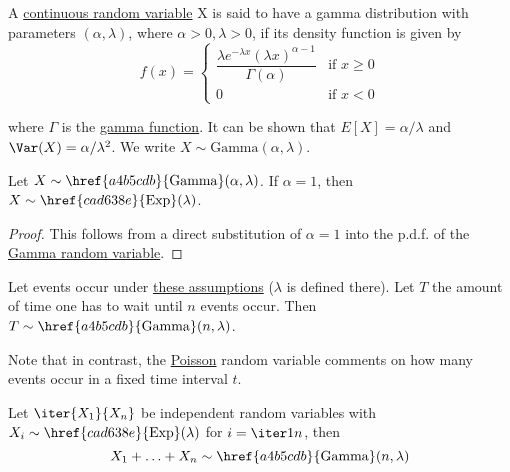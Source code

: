 \label{a4b5cdb}

A \href{bdb1e15}{continuous random variable} X is said to have a gamma
distribution with parameters $(\alpha,\lambda)$, where $\alpha>0,\lambda>0$, if
its density function is given by
$$
  f(x)=\begin{cases}
    \dfrac{\lambda e^{-\lambda x}(\lambda x)^{\alpha-1}}{\Gamma(\alpha)} & \text{if }x\geq0 \\
    0                                                                    & \text{if }x<0
  \end{cases}
$$

where $\Gamma$ is the \href{ce1fa3f}{gamma function}. It can be shown that
$E[X]=\alpha/\lambda$ and $\Var(X)=\alpha/\lambda^2$. We write
$X\sim\mathrm{Gamma}(\alpha,\lambda)$.

\label{af98a66}

Let $X\sim\href{a4b5cdb}{\mathrm{Gamma}}(\alpha,\lambda)$. If $\alpha=1$, then
$X\sim\href{cad638e}{\mathrm{Exp}}(\lambda)$.

\begin{proof}
  This follows from a direct substitution of $\alpha=1$ into the p.d.f. of the
  \href{a4b5cdb}{Gamma random variable}.
\end{proof}

\label{de11b28}

Let events occur under \href{d544278}{these assumptions} ($\lambda$ is defined
there). Let $T$ the amount of time one has to wait until $n$ events occur. Then
$T\sim\href{a4b5cdb}{\mathrm{Gamma}}(n,\lambda)$.

Note that in contrast, the \href{fc4dd45}{Poisson} random variable comments on
how many events occur in a fixed time interval $t$.

\label{ba003c7}

Let $\iter{X_1}{X_n}$ be independent random variables with
$X_i\sim\href{cad638e}{\mathrm{Exp}}(\lambda)$ for $i=\iter1n$, then
$$
  X_1+\ldots+X_n\sim\href{a4b5cdb}{\mathrm{Gamma}}(n,\lambda)
$$
